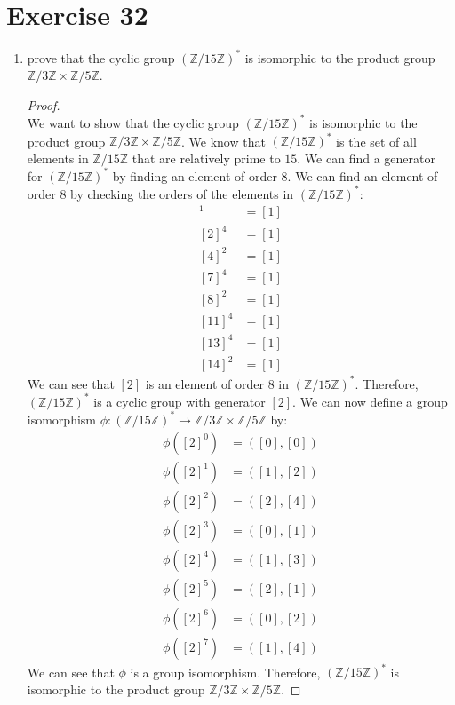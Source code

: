 \documentclass{article}
\begin{document}
\section*{Exercise 32}
\begin{enumerate}
    \item prove that the cyclic group $(\mathbb{Z} / 15\mathbb{Z})^*$ is isomorphic to the product group $\mathbb{Z} / 3\mathbb{Z} \times \mathbb{Z} / 5\mathbb{Z}$.
    \begin{proof}
        \leavevmode \\ 
        We want to show that the cyclic group $(\mathbb{Z} / 15\mathbb{Z})^*$ is isomorphic to the product group $\mathbb{Z} / 3\mathbb{Z} \times \mathbb{Z} / 5\mathbb{Z}$. We know that $(\mathbb{Z} / 15\mathbb{Z})^*$ is the set of all elements in $\mathbb{Z} / 15\mathbb{Z}$ that are relatively prime to $15$. We can find a generator for $(\mathbb{Z} / 15\mathbb{Z})^*$ by finding an element of order $8$. We can find an element of order $8$ by checking the orders of the elements in $(\mathbb{Z} / 15\mathbb{Z})^*$:
        \begin{align*}
            [1]^1 &= [1] \\
            [2]^4 &= [1] \\
            [4]^2 &= [1] \\
            [7]^4 &= [1] \\
            [8]^2 &= [1] \\
            [11]^4 &= [1] \\
            [13]^4 &= [1] \\
            [14]^2 &= [1]
        \end{align*}
        We can see that $[2]$ is an element of order $8$ in $(\mathbb{Z} / 15\mathbb{Z})^*$. Therefore, $(\mathbb{Z} / 15\mathbb{Z})^*$ is a cyclic group with generator $[2]$. We can now define a group isomorphism $\phi: (\mathbb{Z} / 15\mathbb{Z})^* \to \mathbb{Z} / 3\mathbb{Z} \times \mathbb{Z} / 5\mathbb{Z}$ by:
        \begin{align*}
            \phi([2]^0) &= ([0], [0]) \\
            \phi([2]^1) &= ([1], [2]) \\
            \phi([2]^2) &= ([2], [4]) \\
            \phi([2]^3) &= ([0], [1]) \\
            \phi([2]^4) &= ([1], [3]) \\
            \phi([2]^5) &= ([2], [1]) \\
            \phi([2]^6) &= ([0], [2]) \\
            \phi([2]^7) &= ([1], [4])
        \end{align*}
        We can see that $\phi$ is a group isomorphism. Therefore, $(\mathbb{Z} / 15\mathbb{Z})^*$ is isomorphic to the product group $\mathbb{Z} / 3\mathbb{Z} \times \mathbb{Z} / 5\mathbb{Z}$.


\end{proof}
\end{enumerate}
\end{document}
